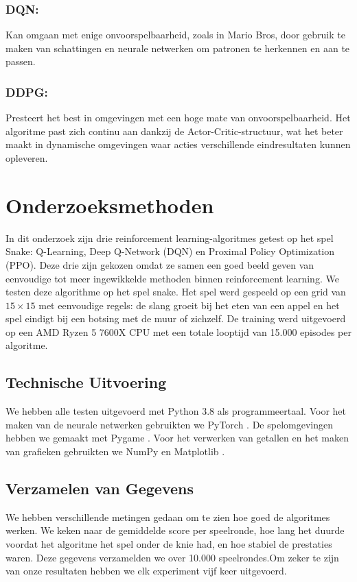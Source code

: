 \documentclass[a4paper,10pt]{report}
\begin{document}
\subsection*{DQN:}
Kan omgaan met enige onvoorspelbaarheid, zoals in Mario Bros, door gebruik te
maken van schattingen en neurale netwerken om patronen te herkennen en aan te
passen.

\subsection*{DDPG:}
Presteert het best in omgevingen met een hoge mate van onvoorspelbaarheid. Het
algoritme past zich continu aan dankzij de Actor-Critic-structuur, wat het
beter maakt in dynamische omgevingen waar acties verschillende eindresultaten
kunnen opleveren.

\chapter{Onderzoeksmethoden}
In dit onderzoek zijn drie reinforcement learning-algoritmes getest op het spel
Snake: Q-Learning, Deep Q-Network (DQN) en Proximal Policy Optimization (PPO).
Deze drie zijn gekozen omdat ze samen een goed beeld geven van eenvoudige tot
meer ingewikkelde methoden binnen reinforcement learning. We testen deze
algorithme op het spel snake. Het spel werd gespeeld op een grid van $15 \times
    15$ met eenvoudige regels: de slang groeit bij het eten van een appel en het
spel eindigt bij een botsing met de muur of zichzelf. De training werd
uitgevoerd op een AMD Ryzen 5 7600X CPU met een totale looptijd van 15.000
episodes per algoritme.  

\section{Technische Uitvoering}
We hebben alle testen uitgevoerd met Python 3.8 \cite{python_docs} als
programmeertaal. Voor het maken van de neurale netwerken gebruikten we PyTorch
\cite{pytorch_docs}. De spelomgevingen hebben we gemaakt met Pygame
\cite{pygame}. Voor het verwerken van getallen en het maken van grafieken
gebruikten we NumPy \cite{numpy_docs} en Matplotlib \cite{matplotlib_docs}.

\section{Verzamelen van Gegevens}
We hebben verschillende metingen gedaan om te zien hoe goed de algoritmes
werken. We keken naar de gemiddelde score per speelronde, hoe lang het duurde
voordat het algoritme het spel onder de knie had, en hoe stabiel de prestaties
waren. Deze gegevens verzamelden we over 10.000 speelrondes.Om zeker te zijn
van onze resultaten hebben we elk experiment vijf keer uitgevoerd.
\end{document}
